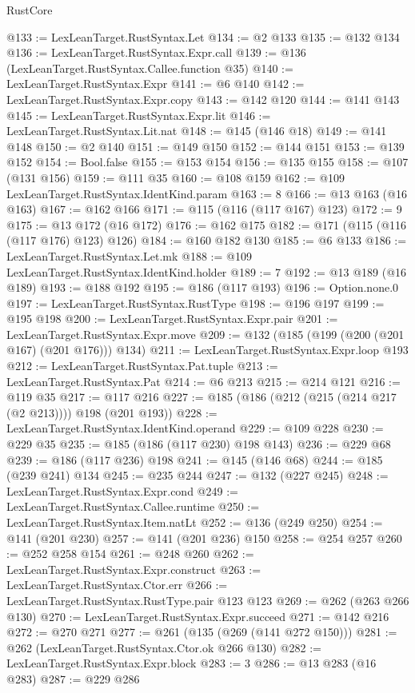 \begin{lexlean}{RustCore}
\begin{coremodule}
@133 := LexLeanTarget.RustSyntax.Let
@134 := @2 @133
@135 := @132 @134
@136 := LexLeanTarget.RustSyntax.Expr.call
@139 := @136 (LexLeanTarget.RustSyntax.Callee.function @35)
@140 := LexLeanTarget.RustSyntax.Expr
@141 := @6 @140
@142 := LexLeanTarget.RustSyntax.Expr.copy
@143 := @142 @120
@144 := @141 @143
@145 := LexLeanTarget.RustSyntax.Expr.lit
@146 := LexLeanTarget.RustSyntax.Lit.nat
@148 := @145 (@146 @18)
@149 := @141 @148
@150 := @2 @140
@151 := @149 @150
@152 := @144 @151
@153 := @139 @152
@154 := Bool.false
@155 := @153 @154
@156 := @135 @155
@158 := @107 (@131 @156)
@159 := @111 @35
@160 := @108 @159
@162 := @109 LexLeanTarget.RustSyntax.IdentKind.param
@163 := 8
@166 := @13 @163 (@16 @163)
@167 := @162 @166
@171 := @115 (@116 (@117 @167) @123)
@172 := 9
@175 := @13 @172 (@16 @172)
@176 := @162 @175
@182 := @171 (@115 (@116 (@117 @176) @123) @126)
@184 := @160 @182 @130
@185 := @6 @133
@186 := LexLeanTarget.RustSyntax.Let.mk
@188 := @109 LexLeanTarget.RustSyntax.IdentKind.holder
@189 := 7
@192 := @13 @189 (@16 @189)
@193 := @188 @192
@195 := @186 (@117 @193)
@196 := Option.none.{0}
@197 := LexLeanTarget.RustSyntax.RustType
@198 := @196 @197
@199 := @195 @198
@200 := LexLeanTarget.RustSyntax.Expr.pair
@201 := LexLeanTarget.RustSyntax.Expr.move
@209 := @132 (@185 (@199 (@200 (@201 @167) (@201 @176))) @134)
@211 := LexLeanTarget.RustSyntax.Expr.loop @193
@212 := LexLeanTarget.RustSyntax.Pat.tuple
@213 := LexLeanTarget.RustSyntax.Pat
@214 := @6 @213
@215 := @214 @121
@216 := @119 @35
@217 := @117 @216
@227 := @185 (@186 (@212 (@215 (@214 @217 (@2 @213)))) @198 (@201 @193))
@228 := LexLeanTarget.RustSyntax.IdentKind.operand
@229 := @109 @228
@230 := @229 @35
@235 := @185 (@186 (@117 @230) @198 @143)
@236 := @229 @68
@239 := @186 (@117 @236) @198
@241 := @145 (@146 @68)
@244 := @185 (@239 @241) @134
@245 := @235 @244
@247 := @132 (@227 @245)
@248 := LexLeanTarget.RustSyntax.Expr.cond
@249 := LexLeanTarget.RustSyntax.Callee.runtime
@250 := LexLeanTarget.RustSyntax.Item.natLt
@252 := @136 (@249 @250)
@254 := @141 (@201 @230)
@257 := @141 (@201 @236) @150
@258 := @254 @257
@260 := @252 @258 @154
@261 := @248 @260
@262 := LexLeanTarget.RustSyntax.Expr.construct
@263 := LexLeanTarget.RustSyntax.Ctor.err
@266 := LexLeanTarget.RustSyntax.RustType.pair @123 @123
@269 := @262 (@263 @266 @130)
@270 := LexLeanTarget.RustSyntax.Expr.succeed
@271 := @142 @216
@272 := @270 @271
@277 := @261 (@135 (@269 (@141 @272 @150)))
@281 := @262 (LexLeanTarget.RustSyntax.Ctor.ok @266 @130)
@282 := LexLeanTarget.RustSyntax.Expr.block
@283 := 3
@286 := @13 @283 (@16 @283)
@287 := @229 @286

\end{coremodule}
\end{lexlean}
